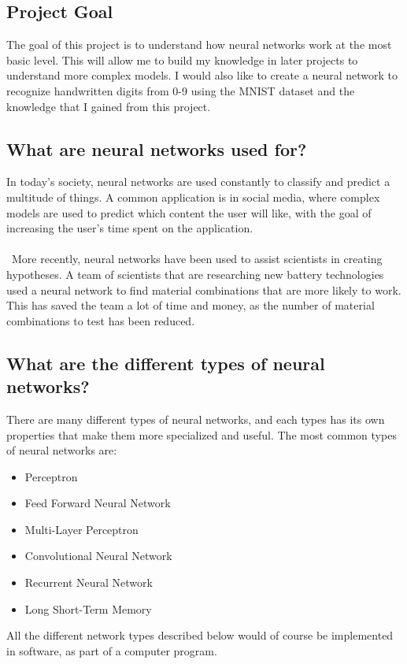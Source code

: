 \documentclass[titlepage]{article}
\begin{document}
\subsection{Project Goal}
The goal of this project is to understand how neural networks work at the most basic level. This will allow me to build my knowledge in later projects to understand more complex models. I would also like to create a neural network to recognize handwritten digits from 0-9 using the MNIST dataset and the knowledge that I gained from this project.

\subsection{What are neural networks used for?}
In today's society, neural networks are used constantly to classify and predict a multitude of things. A common application is in social media, where complex models are used to predict which content the user will like, with the goal of increasing the user's time spent on the application.
\\\\\
More recently, neural networks have been used to assist scientists in creating hypotheses\cite{AI-hypotheses}. A team of scientists that are researching new battery technologies used a neural network to find material combinations that are more likely to work. This has saved the team a lot of time and money, as the number of material combinations to test has been reduced.

\subsection{What are the different types of neural networks?}
There are many different types of neural networks, and each types has its own properties that make them more specialized and useful. The most common types of neural networks are:
\begin{itemize}
    \item Perceptron
    \item Feed Forward Neural Network
    \item Multi-Layer Perceptron
    \item Convolutional Neural Network
    \item Recurrent Neural Network
    \item Long Short-Term Memory
\end{itemize} 
All the different network types described below would of course be implemented in software, as part of a computer program.
\end{document}
